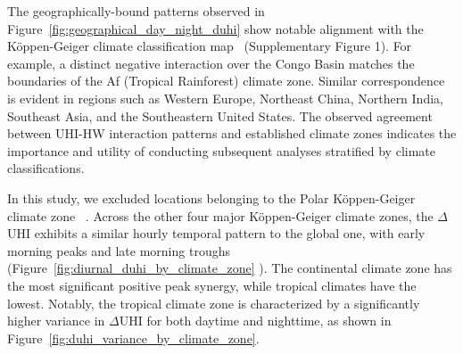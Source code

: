 \bgroup
{}
\begin{figure*}[!htbp]
\centering \makeatletter{}
\makeatother 
\caption{{\textbf{Nighttime \ensuremath{\Delta }UHI is stronger than that of Daytime.} Geographical distributions of \ensuremath{\Delta }UHI during daytime (a) and nighttime (b). }}
\label{fig:geographical_day_night_duhi}
\end{figure*}
\egroup

\bgroup
{}
\begin{figure*}[!htbp]
\centering \makeatletter{}
\makeatother 
\caption{{K{\"{o}}ppen{\textendash}Geiger climate map 1991{\textendash}2020\unskip~\protect\cite{2755510:33598889}}}
\label{fig:koppen_geiger_map}
\end{figure*}
\egroup
The geographically-bound patterns observed in Figure~\ref{fig:geographical_day_night_duhi}  show notable alignment with the K{\"{o}}ppen-Geiger climate classification map\unskip~\cite{2755510:33598889}  (Supplementary Figure 1). For example, a distinct negative interaction over the Congo Basin matches the boundaries of the Af (Tropical Rainforest) climate zone. Similar correspondence is evident in regions such as Western Europe, Northeast China, Northern India, Southeast Asia, and the Southeastern United States. The observed agreement between UHI-HW interaction patterns and established climate zones indicates the importance and utility of conducting subsequent analyses stratified by climate classifications.

In this study, we excluded locations belonging to the Polar K{\"{o}}ppen-Geiger climate zone\unskip~\cite{2755510:33598889} . Across the other four major K{\"{o}}ppen-Geiger climate zones, the \ensuremath{\Delta }UHI exhibits a similar hourly temporal pattern to the global one, with early morning peaks and late morning troughs (Figure~\ref{fig:diurnal_duhi_by_climate_zone} ). The continental climate zone has the most significant positive peak synergy, while tropical climates have the lowest. Notably, the tropical climate zone is characterized by a significantly higher variance in \ensuremath{\Delta }UHI for both daytime and nighttime, as shown in Figure~\ref{fig:duhi_variance_by_climate_zone}.



